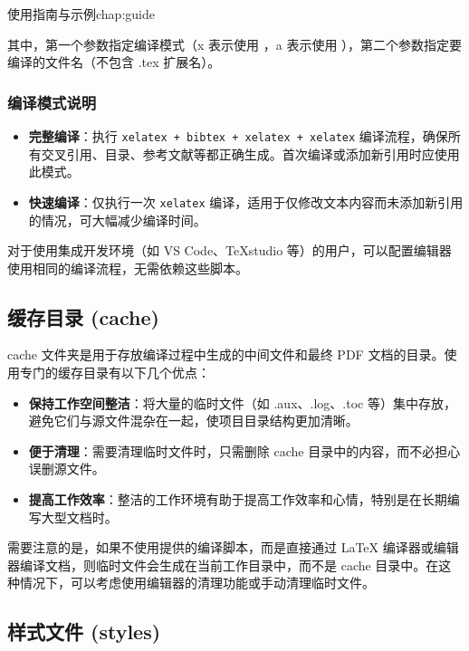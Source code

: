 \begin{cuzchapter}{使用指南与示例}{chap:guide}
\begin{itemize}
              其中，第一个参数指定编译模式（x 表示使用 ，a 表示使用 ），第二个参数指定要编译的文件名（不包含 .tex 扩展名）。
    \end{itemize}

    \subsubsection{编译模式说明}

    \begin{itemize}
        \item \textbf{完整编译}：执行 \verb|xelatex + bibtex + xelatex + xelatex| 编译流程，确保所有交叉引用、目录、参考文献等都正确生成。首次编译或添加新引用时应使用此模式。

        \item \textbf{快速编译}：仅执行一次 \verb|xelatex| 编译，适用于仅修改文本内容而未添加新引用的情况，可大幅减少编译时间。
    \end{itemize}

    对于使用集成开发环境（如 VS Code、TeXstudio 等）的用户，可以配置编辑器使用相同的编译流程，无需依赖这些脚本。

    \subsection{缓存目录 (cache)}\label{sub:cache}

    cache 文件夹是用于存放编译过程中生成的中间文件和最终 PDF 文档的目录。使用专门的缓存目录有以下几个优点：

    \begin{itemize}
        \item \textbf{保持工作空间整洁}：将大量的临时文件（如 .aux、.log、.toc 等）集中存放，避免它们与源文件混杂在一起，使项目目录结构更加清晰。

        \item \textbf{便于清理}：需要清理临时文件时，只需删除 cache 目录中的内容，而不必担心误删源文件。

        \item \textbf{提高工作效率}：整洁的工作环境有助于提高工作效率和心情，特别是在长期编写大型文档时。
    \end{itemize}

    需要注意的是，如果不使用提供的编译脚本，而是直接通过 \LaTeX{} 编译器或编辑器编译文档，则临时文件会生成在当前工作目录中，而不是 cache 目录中。在这种情况下，可以考虑使用编辑器的清理功能或手动清理临时文件。

    \subsection{样式文件 (styles)}\label{sub:styles}


\end{cuzchapter}
